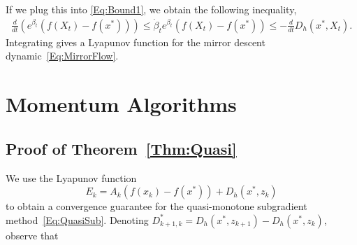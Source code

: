 \documentclass[11pt]{article}
\theoremstyle{plain}
\begin{document}
If we plug this into \eqref{Eq:Bound1}, we obtain the following inequality,
\begin{align*}
 \frac{d}{dt} \left( e^{\beta_t}( f(X_t) - f(x^\ast))\right) \leq\dot \beta_t e^{\beta_t} \left( f(X_t) - f(x^\ast)\right) \leq - \frac{d}{dt} D_h(x^\ast,X_t). 
\end{align*}
Integrating gives a Lyapunov function for the mirror descent dynamic~\eqref{Eq:MirrorFlow}.

%
    \section{Momentum Algorithms}
        \label{App:Momentum}
\subsection{Proof of Theorem~\ref{Thm:Quasi}}
\label{App:ProofQuasi}
We use the Lyapunov function 
\begin{equation*}
E_k = A_k (f(x_k) - f(x^\ast)) + D_h(x^\ast, z_k)
\end{equation*}
to obtain a convergence guarantee for the quasi-monotone subgradient method~\eqref{Eq:QuasiSub}.
Denoting $D^\ast_{k+1, k} = D_h(x^\ast,z_{k+1})- D_h(x^\ast,z_{k})$, observe that
\end{document}
